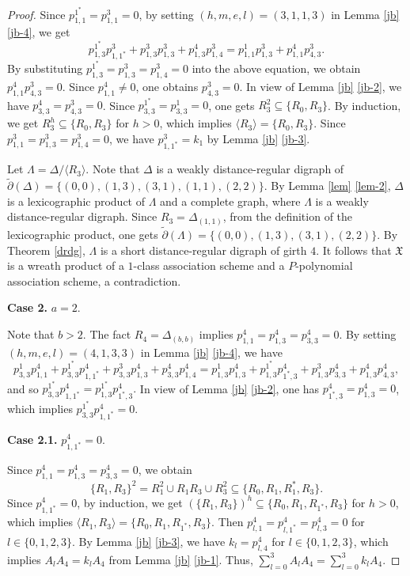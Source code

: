 \documentclass[12pt,a4paper]{amsart}
\theoremstyle{definition}
\begin{document}
\begin{proof}
Since $p_{1,1}^{1^{*}}=p_{1,1}^{3}=0$, by setting $(h,m,e,l)=(3,1,1,3)$ in Lemma \ref{jb} \ref{jb-4}, we get $$p_{1,3}^{1^*}p_{1,1^*}^{3}+p_{1,3}^{3}p_{1,3}^{3}+p_{1,3}^{4}p_{1,4}^{3}=p_{1,1}^{1}p_{1,3}^{3}+p_{1,1}^{4}p_{4,3}^{3}.$$
By substituting $p_{1,3}^{1^{*}}=p_{1,3}^{3}=p_{1,4}^{3}=0$ into the above equation, we obtain $p_{1,1}^{4}p_{4,3}^{3}=0$. Since $p_{1,1}^{4}\neq0$, one obtains $p_{4,3}^{3}=0$. In view of Lemma \ref{jb} \ref{jb-2}, we have $p_{3,3}^{4}=p_{4,3}^{3}=0$. Since $p_{3,3}^{1^{*}}=p_{3,3}^{1}=0$, one gets $R_3^2\subseteq\{R_0,R_3\}$. By induction, we get $R_3^h\subseteq\{R_0,R_3\}$ for $h>0$, which implies $\langle R_3\rangle =\{R_0,R_3\}$. Since $p_{1,1}^3=p_{1,3}^3=p_{1,4}^3=0$, we have $p_{1,1^{*}}^{3}=k_1$ by Lemma \ref{jb} \ref{jb-3}.

Let $\Lambda=\Delta/\langle R_3\rangle$. Note that $\Delta$ is a weakly distance-regular digraph of $\tilde{\partial}(\Delta)=\{(0,0),(1,3),(3,1),(1,1),(2,2)\}$. By Lemma \ref{lem} \ref{lem-2}, $\Delta$ is a lexicographic product of $\Lambda$ and a complete graph, where $\Lambda$ is a weakly distance-regular digraph. Since $R_3=\Delta_{(1,1)}$, from the definition of the lexicographic product, one gets $\tilde{\partial}(\Lambda)=\{(0,0),(1,3),(3,1),(2,2)\}$. By Theorem \ref{drdg}, $\Lambda$ is a short distance-regular digraph of girth $4$. It follows that $\mathfrak{X}$ is a wreath product of a $1$-class association scheme and a $P$-polynomial association scheme, a contradiction.

\textbf{Case 2.} $a=2$.

Note that $b>2$. The fact $R_4=\Delta_{(b,b)}$ implies $p_{1,1}^{4}=p_{1,3}^{4}=p_{3,3}^{4}=0$. By setting $(h,m,e,l)=(4,1,3,3)$ in Lemma \ref{jb} \ref{jb-4}, we have $$p_{3,3}^{1}p_{1,1}^{4}+p_{3,3}^{1^{*}}p_{1,1^{*}}^{4}+p_{3,3}^{3}p_{1,3}^{4}+p_{3,3}^{4}p_{1,4}^{4}=p_{1,3}^{1}p_{1,3}^{4}+p_{1,3}^{1^{*}}p_{1^{*},3}^{4}+p_{1,3}^{3}p_{3,3}^{4}+p_{1,3}^{4}p_{4,3}^{4},$$
and so $p_{3,3}^{1^{*}}p_{1,1^{*}}^{4}=p_{1,3}^{1^{*}}p_{1^{*},3}^{4}.$ In view of Lemma \ref{jb} \ref{jb-2}, one has $p_{1^{*},3}^{4}=p_{1,3}^{4}=0$, which implies $p_{3,3}^{1^{*}}p_{1,1^{*}}^{4}=0.$

\textbf{Case 2.1.} $p_{1,1^{*}}^{4}=0$.

Since $p_{1,1}^4=p_{1,3}^{4}=p_{3,3}^{4}=0$, we obtain $$\{R_1,R_3\}^2= R_1^2\cup R_1R_3 \cup R_3^2\subseteq\{R_0,R_1,R_1^*,R_3\}.$$
Since $p_{1,1^{*}}^{4}=0$, by induction, we get ${(\{R_1,R_3\})}^h\subseteq\{R_0,R_1,R_{1^*},R_3\}$ for $h>0$, which implies $\langle R_1,R_3\rangle=\{R_0,R_1,R_{1^*},R_3\}.$ Then $p_{l,1}^{4}=p_{l,1^{*}}^{4}=p_{l,3}^{4}=0$ for $l\in \{0,1,2,3\}$. By Lemma \ref{jb} \ref{jb-3}, we have $k_l=p_{l,4}^{4}$ for $l\in \{0,1,2,3\}$, which implies $A_lA_4=k_lA_4$ from Lemma \ref{jb} \ref{jb-1}. Thus, $\sum_{l=0}^{3}A_lA_4=\sum_{l=0}^{3}k_lA_4$.


\end{proof}
\end{document}
